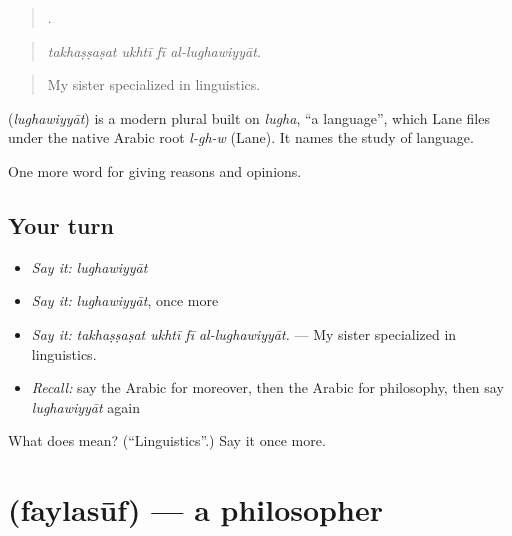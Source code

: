\begin{quote}
   .
\end{quote}

\begin{quote}
\emph{takhaṣṣaṣat ukhtī fī al-lughawiyyāt.}
\end{quote}

\begin{quote}
My sister specialized in linguistics.
\end{quote}

\begin{cousinweb}
\textbf{} (\emph{lughawiyyāt}) is a modern plural built on \emph{lugha}, \textquotedblleft{}a language\textquotedblright{}, which Lane files under the native Arabic root \emph{l-gh-w} (Lane). It names the study of language.
\end{cousinweb}

\begin{grammarlens}[title={What you've built}]
One more word for giving reasons and opinions.
\end{grammarlens}

\subsection*{Your turn}
\begin{itemize}
\raggedright
  \item \emph{Say it:} \emph{lughawiyyāt}
  \item \emph{Say it:} \emph{lughawiyyāt}, once more
  \item \emph{Say it:} \emph{takhaṣṣaṣat ukhtī fī al-lughawiyyāt.} — My sister specialized in linguistics.
  \item \emph{Recall:} say the Arabic for moreover, then the Arabic for philosophy, then say \emph{lughawiyyāt} again
\end{itemize}

\begin{tcolorbox}[breakable,colback=teal!4,colframe=teal!35!black,title={Before you move on}]
What does  mean? (\textquotedblleft{}Linguistics\textquotedblright{}.) Say it once more.
\end{tcolorbox}
\section[\texorpdfstring{\ar{فيلسوف} (faylasūf)}{فيلسوف (faylasūf)}]{ (faylasūf) — a philosopher}

